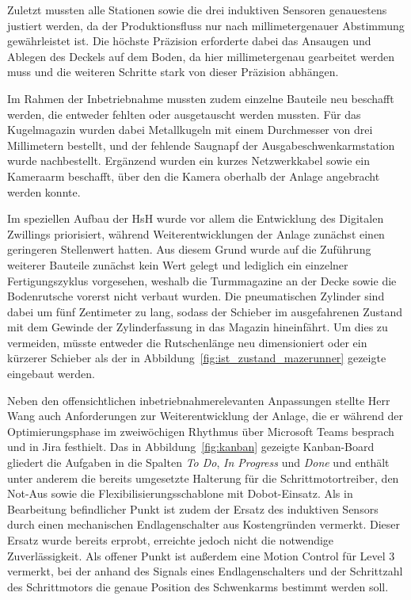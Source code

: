 Zuletzt mussten alle Stationen sowie die drei induktiven Sensoren genauestens justiert werden, da der Produktionsfluss nur nach millimetergenauer Abstimmung gewährleistet ist.
Die höchste Präzision erforderte dabei das Ansaugen und Ablegen des Deckels auf dem Boden, da hier millimetergenau gearbeitet werden muss und die weiteren Schritte stark von dieser Präzision abhängen.

Im Rahmen der Inbetriebnahme mussten zudem einzelne Bauteile neu beschafft werden, die entweder fehlten oder ausgetauscht werden mussten.
Für das Kugelmagazin wurden dabei Metallkugeln mit einem Durchmesser von drei Millimetern bestellt, und der fehlende Saugnapf der Ausgabeschwenkarmstation wurde nachbestellt.
Ergänzend wurden ein kurzes Netzwerkkabel sowie ein Kameraarm beschafft, über den die Kamera oberhalb der Anlage angebracht werden konnte.

Im speziellen Aufbau der HsH wurde vor allem die Entwicklung des Digitalen Zwillings priorisiert, während Weiterentwicklungen der Anlage zunächst einen geringeren Stellenwert hatten.
Aus diesem Grund wurde auf die Zuführung weiterer Bauteile zunächst kein Wert gelegt und lediglich ein einzelner Fertigungszyklus vorgesehen, weshalb die Turmmagazine an der Decke sowie die Bodenrutsche vorerst nicht verbaut wurden.
Die pneumatischen Zylinder sind dabei um fünf Zentimeter zu lang, sodass der Schieber im ausgefahrenen Zustand mit dem Gewinde der Zylinderfassung in das Magazin hineinfährt.
Um dies zu vermeiden, müsste entweder die Rutschenlänge neu dimensioniert oder ein kürzerer Schieber als der in Abbildung~\ref{fig:ist_zustand_mazerunner} gezeigte eingebaut werden.

Neben den offensichtlichen inbetriebnahmerelevanten Anpassungen stellte Herr Wang auch Anforderungen zur Weiterentwicklung der Anlage, die er während der Optimierungsphase im zweiwöchigen Rhythmus über Microsoft Teams besprach und in Jira festhielt.
Das in Abbildung~\ref{fig:kanban} gezeigte Kanban-Board gliedert die Aufgaben in die Spalten \emph{To Do}, \emph{In Progress} und \emph{Done} und enthält unter anderem die bereits umgesetzte Halterung für die Schrittmotortreiber, den Not-Aus sowie die Flexibilisierungsschablone mit Dobot-Einsatz.
Als in Bearbeitung befindlicher Punkt ist zudem der Ersatz des induktiven Sensors durch einen mechanischen Endlagenschalter aus Kostengründen vermerkt.
Dieser Ersatz wurde bereits erprobt, erreichte jedoch nicht die notwendige Zuverlässigkeit.
Als offener Punkt ist außerdem eine Motion Control für Level 3 vermerkt, bei der anhand des Signals eines Endlagenschalters und der Schrittzahl des Schrittmotors die genaue Position des Schwenkarms bestimmt werden soll.

